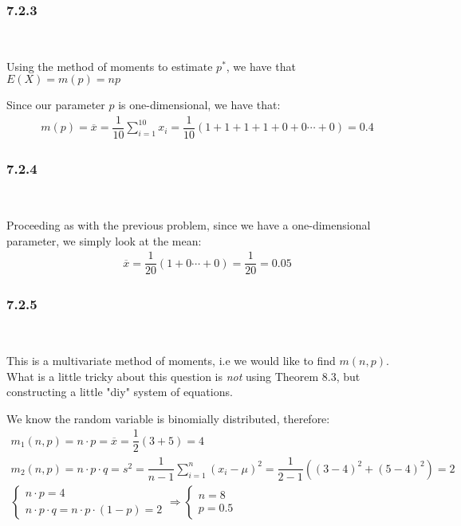 \subsubsection{7.2.3}\hfill\\\par
\noindent Using the method of moments to estimate $p^*$, we have that $E(X) = m(p) = np$ 
\par\bigskip
\noindent Since our parameter $p$ is one-dimensional, we have that:
\begin{equation*}
  \begin{gathered}
    m(p) = \overline{x} = \dfrac{1}{10}\sum_{i=1}^{10}x_i = \dfrac{1}{10}(1+1+1+1+0+0\cdots+0) = 0.4
  \end{gathered}
\end{equation*}

\par\bigskip
\subsubsection{7.2.4}\hfill\\\par
\noindent Proceeding as with the previous problem, since we have a one-dimensional parameter, we simply look at the mean:
\begin{equation*}
  \begin{gathered}
    \overline{x} = \dfrac{1}{20}(1+0\cdots+0) = \dfrac{1}{20} = 0.05
  \end{gathered}
\end{equation*}
\par\bigskip
\subsubsection{7.2.5}\hfill\\\par
\noindent This is a multivariate method of moments, i.e we would like to find $m(n,p)$. What is a little tricky about this question is \textit{not} using Theorem 8.3, but constructing a little "diy" system of equations.
\par\bigskip
\noindent We know the random variable is binomially distributed, therefore:
\begin{equation*}
  \begin{gathered}
    m_1(n,p) = n\cdot p = \overline{x} = \dfrac{1}{2}(3+5) = 4\\
    m_2(n,p) = n\cdot p\cdot q = s^2 = \dfrac{1}{n-1}\sum_{i=1}^{n}(x_i-\mu)^2 = \dfrac{1}{2-1}((3-4)^2 + (5-4)^2) = 2\\
    \begin{cases}
      n\cdot p = 4\\
      n\cdot p \cdot q = n\cdot p\cdot(1-p) = 2
      \end{cases}\Rightarrow\begin{cases}n = 8\\p = 0.5\end{cases}
  \end{gathered}
\end{equation*}
\par\bigskip

